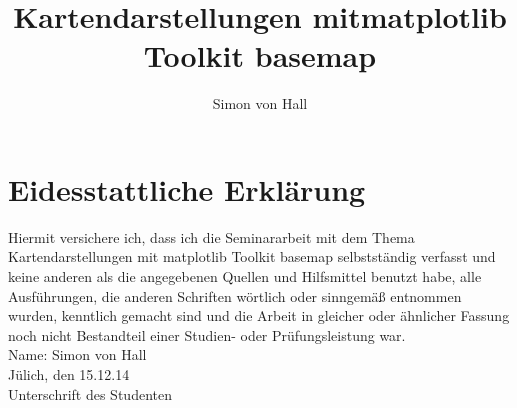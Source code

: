 \documentclass[a4paper,11pt]{article}
\title{Kartendarstellungen mit\newline matplotlib Toolkit basemap}
\author{Simon von Hall}
\begin{document}
\maketitle
\clearpage
\section{Eidesstattliche Erklärung}
Hiermit versichere ich, dass ich die Seminararbeit mit dem Thema Kartendarstellungen mit  \textsf{matplotlib Toolkit basemap} selbstständig verfasst und keine anderen als die angegebenen Quellen und Hilfsmittel benutzt habe, alle Ausführungen, die anderen Schriften
wörtlich oder sinngemäß entnommen wurden, kenntlich gemacht sind und
die Arbeit in gleicher oder ähnlicher Fassung noch nicht Bestandteil einer
Studien- oder Prüfungsleistung war.\\

Name: Simon von Hall\\

Jülich, den 15.12.14\\

Unterschrift des Studenten
\clearpage
\tableofcontents
\clearpage

\newpage
\newpage
\newpage
\newpage
\newpage
\end{document}
